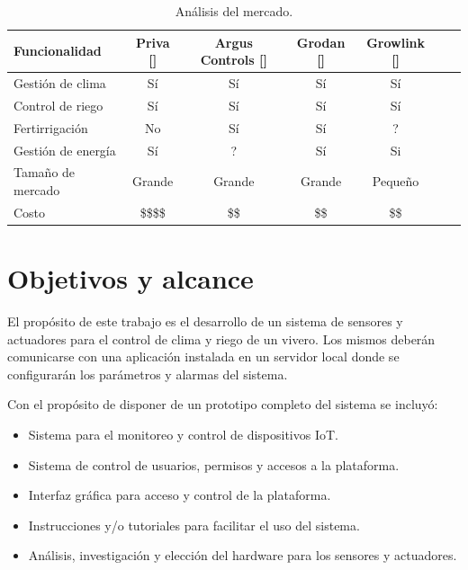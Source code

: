 \begin{table}[h]
\centering
\caption[Análisis del estado del arte]{Análisis del mercado.}

\begin{tabular}{lcccccc} 
\toprule
\textbf{Funcionalidad} & \textbf{Priva []}  & \textbf{Argus Controls []} &\textbf{Grodan []} & \textbf{Growlink []}\\

\midrule
Gestión de clima   & Sí & Sí & Sí & Sí \\
Control de riego   & Sí & Sí & Sí & Sí \\
Fertirrigación     & No & Sí & Sí & ? \\
Gestión de energía & Sí & ? & Sí & Si \\
Tamaño de mercado  & Grande &  Grande & Grande & Pequeño \\
Costo              & \$\$\$\$ &  \$\$ & \$\$ &  \$\$ \\
\bottomrule
\hline
\end{tabular}
\label{tab:vendors}
\end{table}


\section{Objetivos y alcance}


El propósito de este trabajo es el desarrollo de un sistema de sensores y actuadores para el control de clima y riego de un vivero. Los mismos deberán comunicarse con una aplicación instalada en un servidor local donde se configurarán los parámetros y alarmas del sistema.

Con el propósito de disponer de un prototipo completo del sistema se incluyó:
 
\begin{itemize}
	\item Sistema para el monitoreo y control de dispositivos IoT.
	\item Sistema de control de usuarios, permisos y accesos a la plataforma.
	\item Interfaz gráfica para acceso y control de la plataforma.
	\item Instrucciones y/o tutoriales para facilitar el uso del sistema.
	\item Análisis, investigación y elección del hardware para los sensores y actuadores.


\end{itemize}


